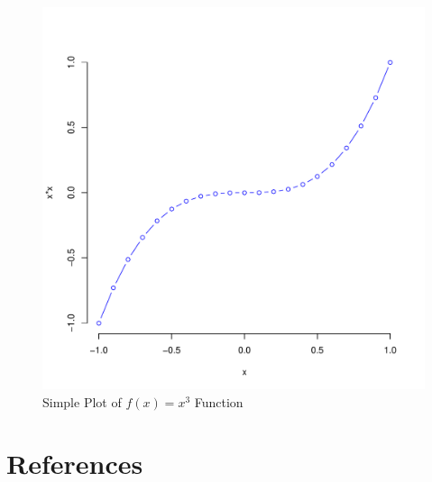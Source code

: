 \documentclass[10pt]{article}\usepackage[]{graphicx}\usepackage[]{color}
\newenvironment{knitrout}{}{} %
\begin{document}
\begin{figure}[H] %
\begin{center}

\begin{knitrout}
\color{fgcolor}
\includegraphics[width=.47\linewidth]{figure/unnamed-chunk-6-1} 

\end{knitrout}

\caption {Simple Plot of $f(x)=x^3$ Function}
\label{fig2}
\end {center}
\end {figure}

\section*{References}\label{pubs}
\printbibliography[heading =none]
\end{document}
